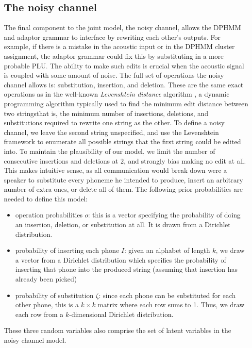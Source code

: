 \documentclass[12pt,letterpaper]{article}
\begin{document}
\subsection{The noisy channel}
The final component to the joint model, the noisy channel, allows the DPHMM and adaptor grammar to interface by rewriting each other's outputs. For example, if there is a mistake in the acoustic input or in the DPHMM cluster assignment, the adaptor grammar could fix this by substituting in a more probable PLU. The ability to make such edits is crucial when the acoustic signal is coupled with some amount of noise. The full set of operations the noisy channel allows is: substitution, insertion, and deletion. These are the same exact operations as in the well-known \textit{Levenshtein distance} algorithm \citep{levenshtein:1966}, a dynamic programming algorithm typically used to find the minimum edit distance between two strings\textemdash that is, the minimum number of insertions, deletions, and substitutions required to rewrite one string as the other. To define a noisy channel, we leave the second string unspecified, and use the Levenshtein framework to enumerate all possible strings that the first string could be edited into. To maintain the plausibility of our model, we limit the number of consecutive insertions and deletions at 2, and strongly bias making no edit at all. This makes intuitive sense, as all communication would break down were a speaker to substitute every phoneme he intended to produce, insert an arbitrary number of extra ones, or delete all of them. The following prior probabilities are needed to define this model: 
\begin{itemize}
    \item operation probabilities $o$: this is a vector specifying the probability of doing an insertion, deletion, or substitution at all. It is drawn from a Dirichlet distribution.
    \item probability of inserting each phone $I$: given an alphabet of length $k$, we draw a vector from a Dirichlet distribution which specifies the probability of inserting that phone into the produced string (assuming that insertion has already been picked)
    \item probability of substitution $\zeta$: since each phone can be substituted for each other phone, this is a $k\times k$ matrix where each row sums to 1. Thus, we draw each row from a $k$-dimensional Dirichlet distribution. 
\end{itemize}

These three random variables also comprise the set of latent variables in the noisy channel model. 
\end{document}

